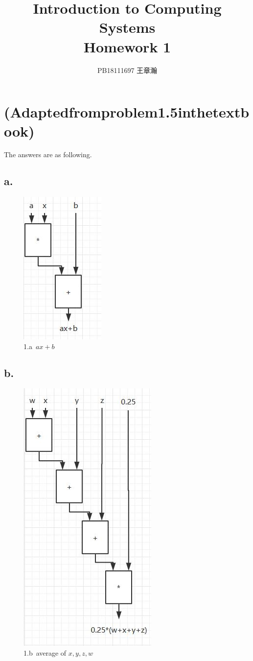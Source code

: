 \documentclass[11pt,a4paper]{article}
\title{Introduction to Computing Systems\\Homework 1}
\author{PB18111697 王章瀚}
\begin{document}
	\maketitle
	\section{(Adaptedfromproblem1.5inthetextbook)}
	The answers are as following.
	\subsection*{a.}
	\begin{figure}[H]
		\centering
		\includegraphics[scale=0.7]{1_a.jpg}
		\caption{1.a\ $ax+b$}
		\label{1.a}
	\end{figure}\par
	\subsection*{b.}
	\begin{figure}[H]
		\centering
		\includegraphics[scale=0.7]{1_b.jpg}
		\caption{1.b\ average of $x, y, z, w$}
		\label{1.b}
	\end{figure}\par
\end{document}
